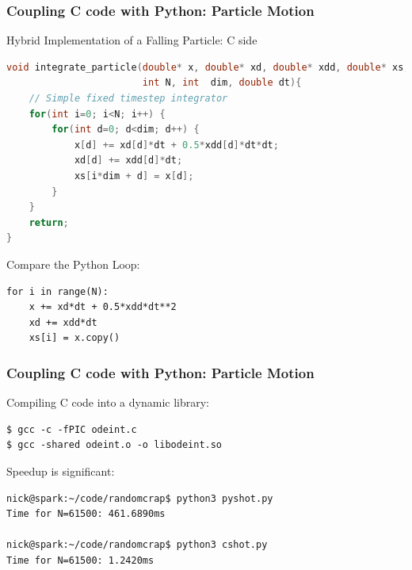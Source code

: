\documentclass[landscape,10pt]{beamer}
\begin{document}
\begin{frame}[fragile]
\frametitle{Coupling C code with Python: Particle Motion}
Hybrid Implementation of a Falling Particle: C side
\begin{scriptsize}
\begin{lstlisting}[language=C]
void integrate_particle(double* x, double* xd, double* xdd, double* xs,
                        int N, int  dim, double dt){
    // Simple fixed timestep integrator
    for(int i=0; i<N; i++) {
        for(int d=0; d<dim; d++) {
            x[d] += xd[d]*dt + 0.5*xdd[d]*dt*dt;
            xd[d] += xdd[d]*dt;
            xs[i*dim + d] = x[d];
        }
    }
    return;
}
\end{lstlisting}
\end{scriptsize}
Compare the Python Loop:
\begin{scriptsize}
\begin{lstlisting}
for i in range(N):
    x += xd*dt + 0.5*xdd*dt**2
    xd += xdd*dt
    xs[i] = x.copy()
\end{lstlisting}
\end{scriptsize}

\end{frame}

\begin{frame}[fragile]
\frametitle{Coupling C code with Python: Particle Motion}
Compiling C code into a dynamic library:
\begin{verbatim}
$ gcc -c -fPIC odeint.c
$ gcc -shared odeint.o -o libodeint.so
\end{verbatim}

Speedup is significant:
\begin{verbatim}
nick@spark:~/code/randomcrap$ python3 pyshot.py
Time for N=61500: 461.6890ms

nick@spark:~/code/randomcrap$ python3 cshot.py
Time for N=61500: 1.2420ms
\end{verbatim}
\end{frame}
\end{document}
